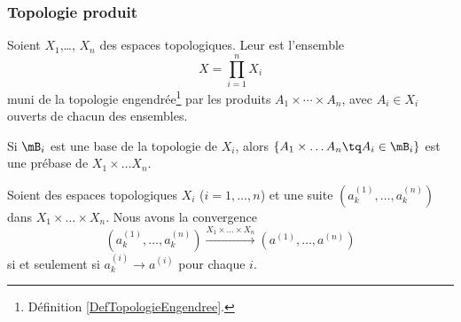 \subsubsection{Topologie produit}

\begin{definition}      \label{DefIINHooAAjTdY}
    Soient \( X_1\),\ldots, \( X_n\) des espaces topologiques. Leur  est l'ensemble
    \begin{equation}
        X=\prod_{i=1}^nX_i
    \end{equation}
    muni de la topologie engendrée\footnote{Définition \ref{DefTopologieEngendree}.} par les produits \(A_1\times \cdots\times A_n\), avec \( A_i\in X_i \) ouverts de chacun des ensembles.
\end{definition}

\begin{lemma}       \label{LEMooKJJNooMHNcSP}
    Si \( \mB_i\) est une base de la topologie de \( X_i\), alors \( \{ A_1\times \ldots A_n \tq A_i\in \mB_i\}\) est une prébase de \( X_1\times \ldots X_n\).
\end{lemma}

\begin{proposition}
    Soient des espaces topologiques \( X_i\) (\( i=1,\ldots, n\)) et une suite \( (a^{(1)}_k,\ldots, a^{(n)}_k)\) dans \( X_1\times\ldots \times X_n\). Nous avons la convergence
    \begin{equation}
        (a^{(1)}_k,\ldots, a^{(n)}_k)\stackrel{X_1\times\ldots \times X_n}{\longrightarrow}(a^{(1)},\ldots, a^{(n)})
    \end{equation}
    si et seulement si \( a^{(i)}_k\to a^{(i)}\) pour chaque \( i\).
\end{proposition}

